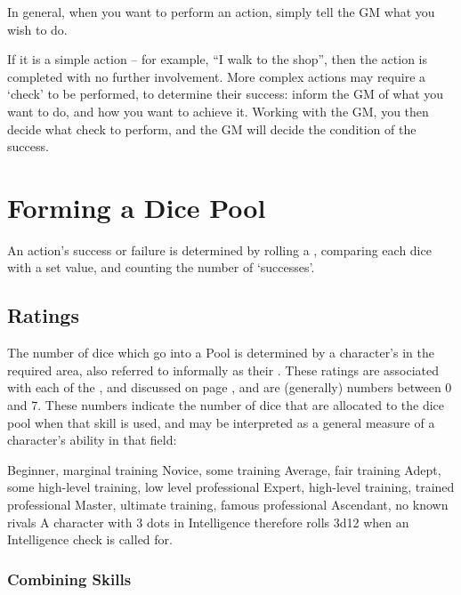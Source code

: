 \label{C:Checks}


In general, when you want to perform an action, simply tell the GM what you wish to do. 

If it is a simple action – for example, “I walk to the shop”, then the action is completed with no further involvement. More complex actions may require a ‘check’ to be performed, to determine their success: inform the GM of what you want to do, and how you want to achieve it. Working with the GM, you then decide what check to perform, and the GM will decide the condition of the success.


\section{Forming a Dice Pool}

An action's success or failure is determined by rolling a , comparing each dice with a set value, and counting the number of `successes'.

\subsection{Ratings}

The number of dice which go into a Pool is determined by a character's  in the required area, also referred to informally as their . These ratings are associated with each of the ,  and  discussed on page \pageref{C:Aspects}, and are (generally) numbers between 0 and 7. These numbers indicate the number of dice that are allocated to the dice pool when that skill is used, and may be interpreted as a general measure of a character's ability in that field:

{Beginner, marginal training}
{Novice, some training}
{Average, fair training}
{Adept, some high-level training, low level professional}
{Expert, high-level training, trained professional}
{Master, ultimate training, famous professional}
{Ascendant, no known rivals}
\normalsize
A character with 3 dots in Intelligence therefore rolls 3d12 when an Intelligence check is called for. 

\subsubsection{Combining Skills}

